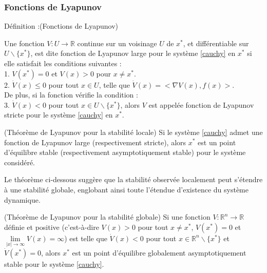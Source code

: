 \documentclass[12pt,a4paper]{report}%
\newcounter{definition}[section] %
\newenvironment{définition}[2][]
  {\refstepcounter{definition}%
  \begin{bclogo}[
    logo=\bcplume,
    couleur=blue!6,    %
    arrondi=0.1,
    couleurBord=white,#1]{Définition \thedefinition :#2}
  }
  {\end{bclogo}}
\begin{document}
\subsubsection{Fonctions de Lyapunov}
\begin{définition}{(Fonctions de Lyapunov)}
	Une fonction \( V : U \rightarrow \mathbb{R} \) continue sur un voisinage \( U \) de \( x^* \), et différentiable sur \( U \backslash \{x^*\} \), est dite fonction de Lyapunov large pour le système \eqref{cauchy} en \( x^* \) si elle satisfait les conditions suivantes :\\
	1. \( V(x^*) = 0 \) et \( V(x) > 0 \) pour \( x \neq x^* \).\\
	2. \( \dot{V}(x)\leq 0 \) pour tout \( x \in U \), telle que \( \dot{V}(x)=<\nabla V(x),f(x) > \).\\
	De plus, si la fonction vérifie la condition :\\
	3. \( \dot{V}(x) < 0 \) pour tout \( x \in U\backslash \{x^*\} \), alors \( V \) est appelée fonction de Lyapunov stricte pour le système \eqref{cauchy} en \( x^* \).
\end{définition}
\begin{théorème}{(Théorème de Lyapunov pour la stabilité locale)}{}
	Si le système \eqref{cauchy} admet une fonction de Lyapunov large (respectivement stricte), alors \( x^* \) est un point d'équilibre stable (respectivement asymptotiquement stable) pour le système considéré.
\end{théorème}
Le théorème ci-dessous suggère que la stabilité observée localement peut s'étendre à une stabilité globale, englobant ainsi toute l'étendue d'existence du système dynamique.
\begin{théorème}{(Théorème de Lyapunov pour la stabilité globale)}{}
	Si une fonction \( V : \mathbb{R}^n \rightarrow \mathbb{R} \) définie et positive (c'est-à-dire $V(x)>0$ pour tout $x\neq x^*$, $V(x^*)=0$ et $\lim\limits_{|x|\rightarrow \infty}V(x)=\infty$) est telle que \( \dot{V}(x) < 0 \) pour tout \( x \in \mathbb{R}^n \backslash \{x^*\} \) et \( \dot{V}(x^*) = 0 \), alors \( x^* \) est un point d'équilibre globalement asymptotiquement stable pour le système \eqref{cauchy}.
\end{théorème} 
\end{document}
